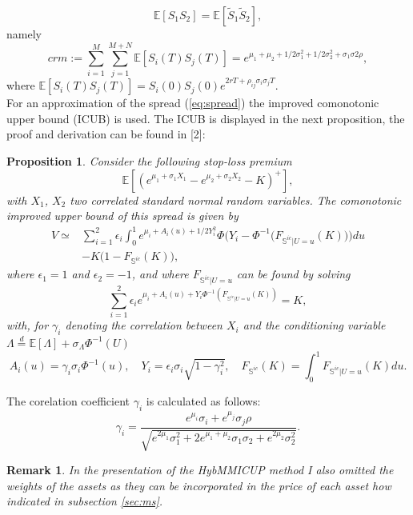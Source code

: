 \documentclass[a4paper]{article}
\newtheorem{prop}{Proposition}
\newtheorem*{remark}{Remark}
\begin{document}
$$\mathbb{E}[S_1S_2] = \mathbb{E}[\tilde{S}_1\tilde{S}_2],$$
namely
\begin{equation}
crm:=\sum_{i=1}^{M}\sum_{j=1}^{M+N}\mathbb{E}[S_i(T)S_j(T)]=e^{\mu_1+\mu_2+1/2\sigma_1^2+1/2\sigma_2^2+\sigma_1\sigma2\rho},
\end{equation}
where $\mathbb{E}[S_i(T)S_j(T)] = S_i(0) S_j(0) e^{2rT+\rho_{ij}\sigma_i\sigma_jT}.$\\
For an approximation of the spread (\ref{eq:spread}) the improved comonotonic upper bound (ICUB) is used. The ICUB is displayed in the next proposition, the proof and derivation can be found in [2]:
\begin{prop}
Consider the following stop-loss premium
$$\mathbb{E}[(e^{\mu_1+\sigma_1X_1}-e^{\mu_2+\sigma_2X_2}-K)^+],$$
with $X_1$, $X_2$ two correlated standard normal random variables. The comonotonic improved upper bound of this spread is given by
\begin{equation}
\label{eq:ints}
\begin{split}
V \simeq &\sum_{i=1}^2\epsilon_i\int_0^1e^{\mu_i+A_i(u)+1/2Y_i^2}\Phi\big(Y_i-\Phi^{-1}\big(F_{\mathbb{S}^{ic}|U=u}(K)\big)\big)du\\
	&-K\big(1-F_{\mathbb{S}^{ic}}(K)\big),
\end{split}
\end{equation}
where $\epsilon_1=1$ and $\epsilon_2=-1$, and where $F_{\mathbb{S}^{ic}|U=u}$ can be found by solving
\begin{equation}
\label{eq:fzero}
\sum_{i=1}^2\epsilon_ie^{\mu_i+A_i(u)+Y_i\Phi^{-1}(F_{\mathbb{S}^{ic}|U=u}(K))}=K,
\end{equation}
with, for $\gamma_i$ denoting the correlation between $X_i$ and the conditioning variable $\Lambda \stackrel{d}{=} \mathbb{E}[\Lambda]+\sigma_{\Lambda}\Phi^{-1}(U)$
\begin{equation*}
A_i(u)=\gamma_i\sigma_i\Phi^{-1}(u),\quad Y_i=\epsilon_i\sigma_i\sqrt{1-\gamma_i^2}, \quad F_{\mathbb{S}^{ic}}(K) = \int_0^1F_{\mathbb{S}^{ic}|U=u}(K)du.
\end{equation*}
\end{prop}
The corelation coefficient $\gamma_i$ is calculated as follows:
\begin{equation}
\gamma_i = \frac{e^{\mu_i}\sigma_i+e^{\mu_j}\sigma_j\rho}{\sqrt{e^{2\mu_1}\sigma_1^2+2e^{\mu_1+\mu_2}\sigma_1\sigma_2+e^{2\mu_2}\sigma_2^2}}.
\end{equation}
\begin{remark}
In the presentation of the HybMMICUP method I also omitted the weights of the assets as they can be incorporated in the price of each asset how indicated in subsection \ref{sec:ms}.
\end{remark}
\end{document}
